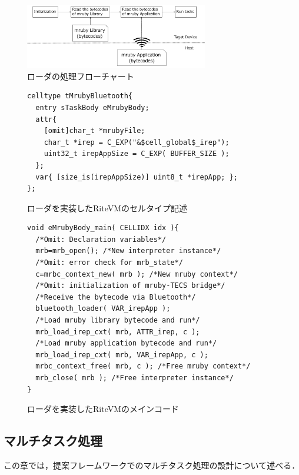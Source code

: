 \documentclass[submit,techrep]{ipsj}
\begin{document}
\begin{figure}[t]
    \centering
    \includegraphics[width=8cm,clip]{../EMSOFT2016/figure/control_flow.pdf}
    \vspace{-2mm}
    \caption{ローダの処理フローチャート}
\vspace{-5mm}
    \label{fig:control_flow}
\end{figure}
\begin{figure}[t]
\centering
\begin{lstlisting}
celltype tMrubyBluetooth{
  entry sTaskBody eMrubyBody;
  attr{
    [omit]char_t *mrubyFile;
    char_t *irep = C_EXP("&$cell_global$_irep");
    uint32_t irepAppSize = C_EXP( BUFFER_SIZE );
  };
  var{ [size_is(irepAppSize)] uint8_t *irepApp; };
};
\end{lstlisting}
    \vspace{-2mm}
\caption{ローダを実装したRiteVMのセルタイプ記述}
\vspace{-4mm}
\label{celltype_mrubybluetooth}
\end{figure}
\begin{figure}[t]
\centering
\begin{lstlisting}
void eMrubyBody_main( CELLIDX idx ){
  /*Omit: Declaration variables*/
  mrb=mrb_open(); /*New interpreter instance*/
  /*Omit: error check for mrb_state*/
  c=mrbc_context_new( mrb ); /*New mruby context*/
  /*Omit: initialization of mruby-TECS bridge*/
  /*Receive the bytecode via Bluetooth*/
  bluetooth_loader( VAR_irepApp );
  /*Load mruby library bytecode and run*/
  mrb_load_irep_cxt( mrb, ATTR_irep, c );
  /*Load mruby application bytecode and run*/
  mrb_load_irep_cxt( mrb, VAR_irepApp, c );
  mrbc_context_free( mrb, c ); /*Free mruby context*/
  mrb_close( mrb ); /*Free interpreter instance*/
}

\end{lstlisting}
    \vspace{-2mm}
\caption{ローダを実装したRiteVMのメインコード}
\vspace{-3mm}
\label{maincode_mrubybluetooth}
\end{figure} 
\vspace{-5mm}
\subsection{マルチタスク処理}
\label{sec:Multitask}
この章では，提案フレームワークでのマルチタスク処理の設計について述べる．
\end{document}
